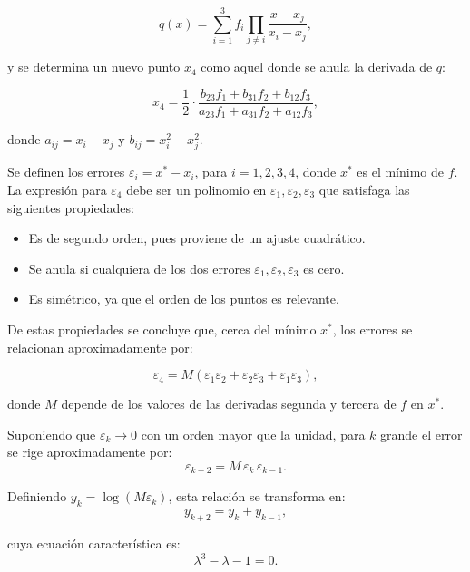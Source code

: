 \documentclass[11pt]{article}
\theoremstyle{ejstyle}
\theoremstyle{ejstyle}
\theoremstyle{ejstyle}
\theoremstyle{ejstyle}
\theoremstyle{ejstyle}
\theoremstyle{ejstyle}
\theoremstyle{ejstyle}
\begin{document}
	\begin{equation}
		q(x) = \sum_{i=1}^{3} f_i \prod_{j \neq i} \frac{x - x_j}{x_i - x_j},
		\label{eq:8.7}
	\end{equation}
	
	y se determina un nuevo punto $x_4$ como aquel donde se anula la derivada de $q$:
	
	\begin{equation}
		x_4 = \frac{1}{2} \cdot \frac{b_{23}f_1 + b_{31}f_2 + b_{12}f_3}{a_{23}f_1 + a_{31}f_2 + a_{12}f_3},
		\label{eq:8.8}
	\end{equation}
	
	donde $a_{ij} = x_i - x_j$ y $b_{ij} = x_i^2 - x_j^2$.
	
	Se definen los errores $\varepsilon_i = x^* - x_i$, para $i = 1, 2, 3, 4$, donde $x^*$ es el mínimo de $f$. La expresión para $\varepsilon_4$ debe ser un polinomio en $\varepsilon_1, \varepsilon_2, \varepsilon_3$ que satisfaga las siguientes propiedades:
	
	\begin{itemize}
		\item Es de segundo orden, pues proviene de un ajuste cuadrático.
		\item Se anula si cualquiera de los dos errores $\varepsilon_1, \varepsilon_2, \varepsilon_3$ es cero.
		\item Es simétrico, ya que el orden de los puntos es relevante.
	\end{itemize}
	
	De estas propiedades se concluye que, cerca del mínimo $x^*$, los errores se relacionan aproximadamente por:
	
	\begin{equation}
		\varepsilon_4 = M(\varepsilon_1\varepsilon_2 + \varepsilon_2\varepsilon_3 + \varepsilon_1\varepsilon_3),
		\label{eq:8.9}
	\end{equation}
	
	donde $M$ depende de los valores de las derivadas segunda y tercera de $f$ en $x^*$.
	
	Suponiendo que $\varepsilon_k \to 0$ con un orden mayor que la unidad, para $k$ grande el error se rige aproximadamente por:
	\[
	\varepsilon_{k+2} = M\,\varepsilon_k\,\varepsilon_{k-1}.
	\]
	
	Definiendo $y_k = \log(M\varepsilon_k)$, esta relación se transforma en:
	\[
	y_{k+2} = y_k + y_{k-1},
	\]
	
	cuya ecuación característica es:
	\begin{equation}
		\lambda^3 - \lambda - 1 = 0.
	\end{equation}
	
\end{document}
